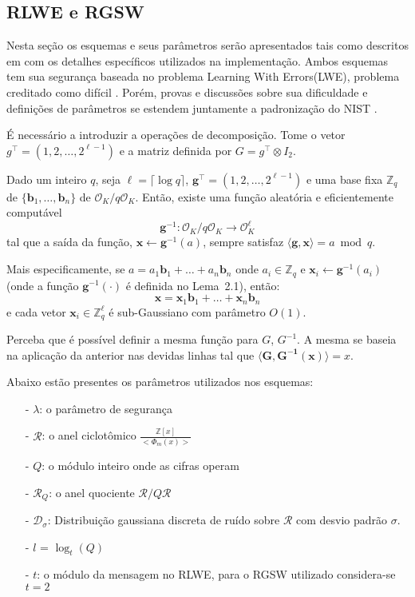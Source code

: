 \subsection{RLWE e RGSW}
Nesta seção os esquemas e seus parâmetros serão apresentados tais como descritos em \cite{lw23I} com 
os detalhes específicos utilizados na implementação. Ambos esquemas tem sua segurança baseada no problema Learning With Errors(LWE), problema creditado como difícil \cite{BrakerskiEtAl2013}. Porém, provas e discussões sobre sua dificuldade e definições de parâmetros se estendem juntamente a padronização do NIST \cite{Balbas2021}. 

É necessário a introduzir a operações de decomposição. Tome o vetor $g^\top = (1, 2, \dots, 2^{\ell-1})$ e a matriz definida por $G = g^\top \otimes I_2$.  

\begin{lemma}
Dado um inteiro $q$, seja $\ell = \lceil \log q \rceil$, $\mathbf{g}^\top = (1, 2, \dots, 2^{\ell - 1})$ e uma base fixa $\mathbb{Z}_q$ de $\{ \mathbf{b}_1, \dots, \mathbf{b}_n \}$ de $\mathcal{O}_K / q \mathcal{O}_K$. Então, existe uma função aleatória e eficientemente computável
\[
\mathbf{g}^{-1} : \mathcal{O}_K / q \mathcal{O}_K \rightarrow \mathcal{O}_K^\ell
\]
tal que a saída da função, $\mathbf{x} \leftarrow \mathbf{g}^{-1}(a)$, sempre satisfaz $\langle \mathbf{g}, \mathbf{x} \rangle = a \bmod q$.

Mais especificamente, se $a = a_1 \mathbf{b}_1 + \dots + a_n \mathbf{b}_n$ onde $a_i \in \mathbb{Z}_q$ e $\mathbf{x}_i \leftarrow \mathbf{g}^{-1}(a_i)$ (onde a função $\mathbf{g}^{-1}(\cdot)$ é definida no Lema~2.1), então:
\[
\mathbf{x} = \mathbf{x}_1 \mathbf{b}_1 + \dots + \mathbf{x}_n \mathbf{b}_n
\]
e cada vetor $\mathbf{x}_i \in \mathbb{Z}_q^\ell$ é sub-Gaussiano com parâmetro $O(1)$.
\end{lemma}

Perceba que é possível definir a mesma função para $G$, $G^{-1}$. A mesma se baseia na aplicação da anterior nas devidas linhas tal que $\langle \mathbf{G}, \mathbf{G^{-1}(x)} \rangle = x$.

Abaixo estão presentes os parâmetros utilizados nos esquemas:

\begin{itemize}[itemsep=0pt, parsep=0pt]
    \item[-] $\lambda$: o parâmetro de segurança
    \item[-] $\mathcal{R}$: o anel ciclotômico $\frac{\mathbb{Z}[x]}{<\Phi_{m}(x)>}$
    \item[-] $Q$: o módulo inteiro onde as cifras operam
    \item[-] $\mathcal{R}_{Q}$: o anel quociente $\mathcal{R}/Q\mathcal{R}$
    \item[-] $\mathcal{D_{\sigma}}$: Distribuição gaussiana discreta de ruído sobre $\mathcal{R}$ com desvio padrão $\sigma$.
    \item[-] $l$ = $\log_t(Q)$ 
    \item[-] $t$: o módulo da mensagem no RLWE, para o RGSW utilizado considera-se $t=2$
\end{itemize}

